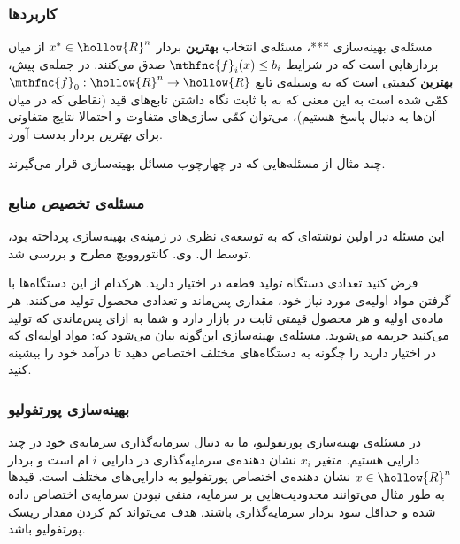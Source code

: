 \subsubsection{
کاربردها
}

مسئله‌ی بهینه‌سازی ***، مسئله‌ی انتخاب
\textbf{
بهترین
}
بردار
$x^* \in \hollow{R}^n$
از میان بردارهایی است که در شرایط
$\mthfnc{f}_i(x) \leq b_i$
صدق می‌کنند. در جمله‌ی پیش،
\textbf{
بهترین
}
کیفیتی است که به وسیله‌ی تابع
$\mthfnc{f}_0: \hollow{R}^n \rightarrow \hollow{R}$
کمّی شده است به این معنی که به با ثابت نگاه داشتن تابع‌های قید (نقاطی که در میان آن‌ها به دنبال پاسخ هستیم)، می‌توان کمّی سازی‌های متفاوت و احتمالا نتایج متفاوتی برای
\emph{
بهترین
}
بردار بدست آورد.

چند مثال از مسئله‌هایی که در چهارچوب مسائل بهینه‌سازی قرار می‌گیرند.

\subsubsection{
مسئله‌ی تخصیص منابع
}
این مسئله در اولین نوشته‌ای که به توسعه‌ی نظری در زمینه‌ی بهینه‌سازی پرداخته بود، توسط ال. وی. کانتوروویچ
مطرح و بررسی شد.
\cite{kantorovich1960}


فرض کنید تعدادی دستگاه تولید قطعه در اختیار دارید. هرکدام از این دستگاه‌ها با گرفتن مواد اولیه‌ی مورد نیاز خود، مقداری پس‌ماند و تعدادی محصول تولید می‌کنند. هر ماده‌ی اولیه و هر محصول قیمتی ثابت در بازار دارد و شما به ازای پس‌ماندی که تولید می‌کنید جریمه می‌شوید. مسئله‌ی بهینه‌سازی این‌گونه بیان می‌شود که: مواد اولیه‌ای که در اختیار دارید را چگونه به دستگاه‌های مختلف اختصاص دهید تا درآمد خود را بیشینه کنید.


\subsubsection{
بهینه‌سازی پورتفولیو
}
در مسئله‌ی بهینه‌سازی پورتفولیو، ما به دنبال سرمایه‌گذاری سرمایه‌ی
خود در چند دارایی
هستیم. متغیر
$x_i$
نشان دهنده‌ی سرمایه‌گذاری در دارایی
$i$
ام است و بردار
$x \in \hollow{R}^n$
نشان دهنده‌ی اختصاص پورتفولیو به دارایی‌های مختلف است. قیدها به طور مثال می‌توانند محدودیت‌هایی بر سرمایه، منفی نبودن سرمایه‌ی اختصاص داده شده و حداقل سود بردار سرمایه‌گذاری باشند. هدف می‌تواند کم کردن مقدار ریسک
پورتفولیو باشد.



